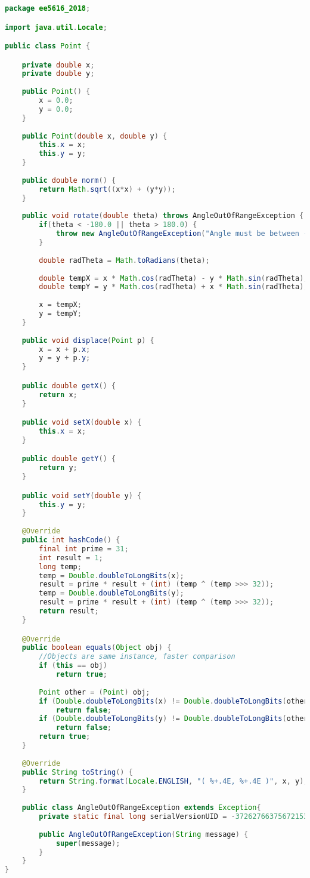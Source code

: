 \begin{lstlisting}[language=java,
    label=lst:point,
    caption=Class Point
]
package ee5616_2018;

import java.util.Locale;

public class Point {

	private double x;
	private double y;
	
	public Point() {
		x = 0.0;
		y = 0.0;
	}
	
	public Point(double x, double y) {
		this.x = x;
		this.y = y;
	}
	
	public double norm() {
		return Math.sqrt((x*x) + (y*y));
	}
    
    public void rotate(double theta) throws AngleOutOfRangeException {
		if(theta < -180.0 || theta > 180.0) {
			throw new AngleOutOfRangeException("Angle must be between -180 and 180 degree");
		}
		
		double radTheta = Math.toRadians(theta);
		
		double tempX = x * Math.cos(radTheta) - y * Math.sin(radTheta);
		double tempY = y * Math.cos(radTheta) + x * Math.sin(radTheta);
		
		x = tempX;
		y = tempY;
	}
	
	public void displace(Point p) {
		x = x + p.x;
		y = y + p.y;
	}

	public double getX() {
		return x;
	}

	public void setX(double x) {
		this.x = x;
	}

	public double getY() {
		return y;
	}

	public void setY(double y) {
		this.y = y;
	}
	
	@Override
	public int hashCode() {
		final int prime = 31;
		int result = 1;
		long temp;
		temp = Double.doubleToLongBits(x);
		result = prime * result + (int) (temp ^ (temp >>> 32));
		temp = Double.doubleToLongBits(y);
		result = prime * result + (int) (temp ^ (temp >>> 32));
		return result;
	}

	@Override
	public boolean equals(Object obj) {
		//Objects are same instance, faster comparison
		if (this == obj)
			return true;
		
		Point other = (Point) obj;
		if (Double.doubleToLongBits(x) != Double.doubleToLongBits(other.x))
			return false;
		if (Double.doubleToLongBits(y) != Double.doubleToLongBits(other.y))
			return false;
		return true;
	}
	
	@Override
	public String toString() {
		return String.format(Locale.ENGLISH, "( %+.4E, %+.4E )", x, y);
	}
	
	public class AngleOutOfRangeException extends Exception{
		private static final long serialVersionUID = -3726276637567215315L;
		
		public AngleOutOfRangeException(String message) {
			super(message);
		}
	}
}
\end{lstlisting}